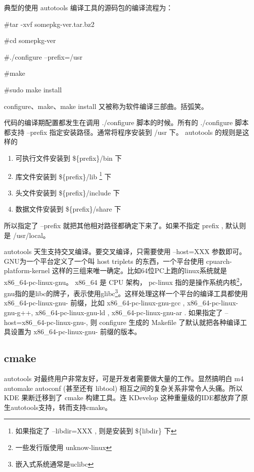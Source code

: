 典型的使用 autotools 编译工具的源码包的编译流程为：

\begin{code}
\#tar -xvf somepkg-ver.tar.bz2

\#cd somepkg-ver

\#./configure --prefix=/usr %

\#make

\#sudo make install
\end{code}

configure、make、make install 又被称为软件编译三部曲。括弧笑。

代码的编译期配置都发生在调用 ./configure 脚本的时候。所有的 ./configure 脚本都支持 --prefix 指定安装路径。通常将程序安装到 /usr 下。
autotools 的规则是这样的

\begin{enumerate}
\item 可执行文件安装到 \$\{prefix\}/bin 下
\item 库文件安装到 \$\{prefix\}/lib \footnote{如果指定了 --libdir=XXX , 则是安装到 \$\{libdir\} 下 } 下
\item 头文件安装到 \$\{prefix\}/include 下
\item 数据文件安装到 \$\{prefix\}/share 下
\end{enumerate}

所以指定了 --prefix 就把其他相对路径都确定下来了。如果不指定 prefix , 默认则是 /usr/local。

autotools 天生支持交叉编译。要交叉编译，只需要使用 --host=XXX 参数即可。
GNU为一个平台定义了一个叫 host triplets 的东西，一个平台使用 cpuarch-platform-kernel 这样的三组来唯一确定。比如64位PC上跑的linux系统就是 x86\_64-pc-linux-gnu。 x86\_64 是 CPU 架构， pc-linux 指的是操作系统内核\footnote{一些发行版使用 unknow-linux}，gnu指的是libc的牌子，表示使用glibc\footnote{嵌入式系统通常是uclibc}。这样处理这样一个平台的编译工具都使用 x86\_64-pc-linux-gnu- 前缀，比如 x86\_64-pc-linux-gnu-gcc , x86\_64-pc-linux-gnu-g++,  x86\_64-pc-linux-gnu-ld , x86\_64-pc-linux-gnu-ar . 如果指定了 --host=x86\_64-pc-linux-gnu-,  则 configure 生成的 Makefile 了默认就把各种编译工具设置为 x86\_64-pc-linux-gnu- 前缀的版本。


\subsection{cmake}\label{section:cmake}

autotools 对最终用户非常友好，可是开发者需要做大量的工作。显然搞明白 m4 automake autoconf (甚至还有 libtool) 相互之间的复杂关系非常令人头痛。所以 KDE 果断迁移到了 cmake 构建工具。连 KDevelop 这种重量级的IDE都放弃了原生autotools支持，转而支持cmake。

